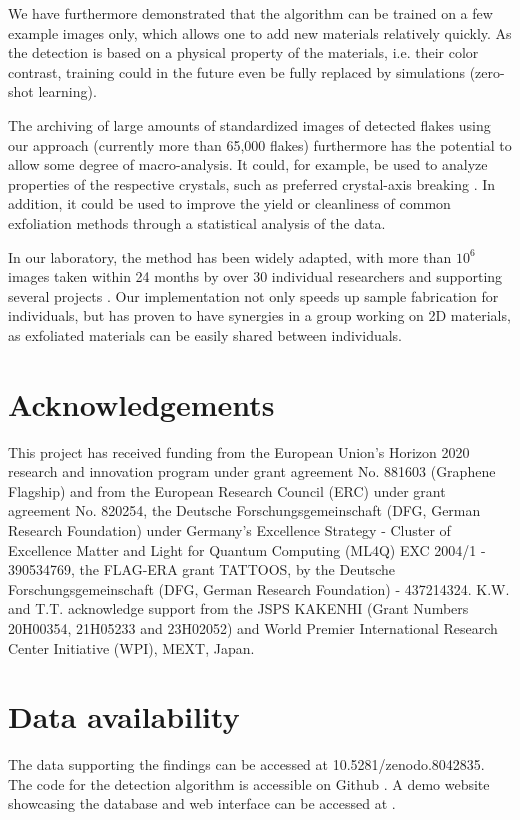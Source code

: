 \documentclass[reprint, prl, superscriptaddress, floatfix]{revtex4-2}
\begin{document}
We have furthermore demonstrated that the algorithm can be trained on a few example images only, which allows one to add new materials relatively quickly.  
As the detection is based on a physical property of the materials, i.e. their color contrast, training could in the future even be fully replaced by simulations (zero-shot learning). 

The archiving of large amounts of standardized images of detected flakes using our approach (currently more than 65,000 flakes) furthermore has the potential to allow some degree of macro-analysis. 
It could, for example, be used to analyze properties of the respective crystals, such as preferred crystal-axis breaking \cite{Han2020Jul}. 
In addition, it could be used to improve the yield or cleanliness of common exfoliation methods through a statistical analysis of the data. 

In our laboratory, the method has been widely adapted, with more than $10^6$ images taken within 24 months by over 30 individual researchers and supporting several projects \cite{Wirth2022, Tebbe2023, Ouaj2023}. 
Our implementation not only speeds up sample fabrication for individuals, but has proven to have synergies in a group working on 2D materials, as exfoliated materials can be easily shared between individuals. 
    
\section{Acknowledgements}
This project has received funding from the European Union’s Horizon 2020 research and innovation program under grant agreement No. 881603 (Graphene Flagship) and from the European Research Council (ERC) under grant agreement No. 820254, the Deutsche Forschungsgemeinschaft (DFG, German Research Foundation) under Germany’s Excellence Strategy - Cluster of Excellence Matter and Light for Quantum Computing (ML4Q) EXC 2004/1 - 390534769, the FLAG-ERA grant TATTOOS, by the Deutsche Forschungsgemeinschaft (DFG, German Research Foundation) - 437214324. 
K.W. and T.T. acknowledge support from the JSPS KAKENHI (Grant Numbers 20H00354, 21H05233 and 23H02052) and World Premier International Research Center Initiative (WPI), MEXT, Japan.
 
\section{Data availability}
The data supporting the findings can be accessed at 10.5281/zenodo.8042835.
The code for the detection algorithm is accessible on Github \cite{code}.
A demo website showcasing the database and web interface can be accessed at \cite{website}.


\end{document}
